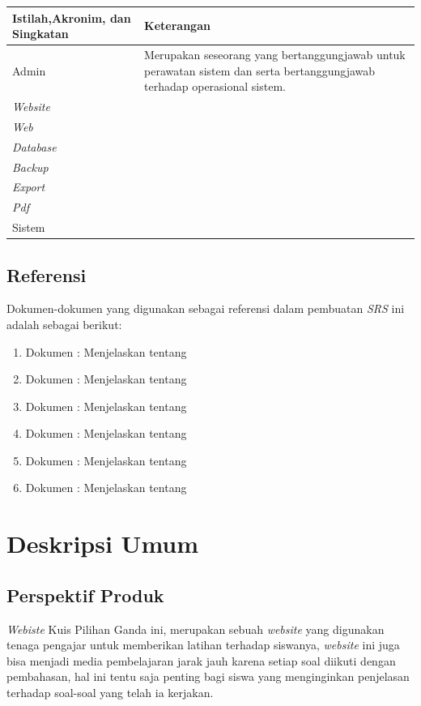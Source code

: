 \documentclass{scrreprt}
\begin{document}
\begin{center}
	\begin{tabular}{|>{\centering\arraybackslash}m{5cm}|>{\centering\arraybackslash}m{9cm}|}
		\hline
			Istilah,Akronim, dan Singkatan & Keterangan\\
		\hline
			Admin & Merupakan seseorang yang bertanggungjawab untuk perawatan sistem dan  serta bertanggungjawab terhadap operasional sistem.\\
		\hline
			\emph{Website} & \\
		\hline
			\emph{Web} & \\
		\hline
			\emph{Database} & \\
		\hline
			\emph{Backup} & \\
		\hline
			\emph{Export} & \\
		\hline
			\emph{Pdf} & \\
		\hline
			Sistem & \\
		\hline
	\end{tabular}
\end{center}



\section{Referensi}
Dokumen-dokumen yang digunakan sebagai referensi dalam pembuatan \emph{SRS} ini adalah sebagai berikut:

\begin{enumerate}
	\item Dokumen : Menjelaskan tentang
	\item Dokumen : Menjelaskan tentang
	\item Dokumen : Menjelaskan tentang
	\item Dokumen : Menjelaskan tentang
	\item Dokumen : Menjelaskan tentang
	\item Dokumen : Menjelaskan tentang
\end{enumerate}




\chapter{Deskripsi Umum}

\section{Perspektif Produk}
\emph{Webiste} Kuis Pilihan Ganda ini, merupakan sebuah \emph{website} yang digunakan tenaga pengajar untuk memberikan latihan terhadap siswanya, \emph{website} ini juga bisa menjadi media pembelajaran jarak jauh karena setiap soal diikuti dengan pembahasan, hal ini tentu saja penting bagi siswa yang menginginkan penjelasan terhadap soal-soal yang telah ia kerjakan.
\end{document}
